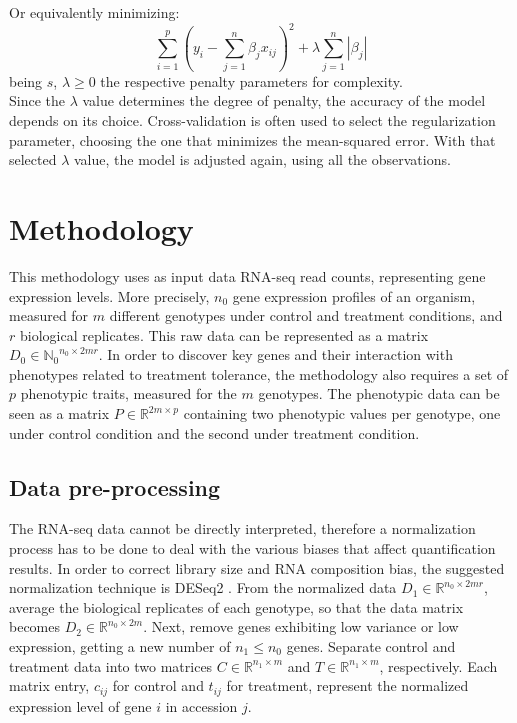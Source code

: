 \documentclass[12pt,journal, onecolumn]{IEEEtran}
\newcommand{\abs}[1]{\left\vert#1\right\vert}
\begin{document}
Or equivalently minimizing:
\begin{equation}
\sum_{i=1}^{p}{\left( y_i-\sum_{j=1}^n{\beta_j x_{ij}}\right)^2} + \lambda \sum_{j=1}^n\abs{\beta_j}
\end{equation}
being $ s $, $ \lambda \geq 0 $ the respective penalty parameters for complexity.\\



Since the $\lambda$ value determines the degree of penalty, the accuracy of the model depends on its choice. Cross-validation is often used to select the regularization parameter, choosing the one that minimizes the mean-squared error. With that selected $\lambda$ value, the model is adjusted again, using all the observations.\\


\section{Methodology}

This methodology uses as input data RNA-seq read counts, representing gene expression levels. More precisely, $n_0$ gene expression profiles of an organism, measured for $m$ different genotypes under control and treatment conditions, and $r$ biological replicates. 
This raw data can be represented as a matrix $D_0 \in {\mathbb{N}_0}^{n_0 \times 2mr}$. 
In order to discover key genes and their interaction with phenotypes related to treatment tolerance, the methodology also requires a set of $p$ phenotypic traits, measured for the $m$ genotypes. The phenotypic data can be seen as a matrix $P \in \mathbb{R}^{2m \times p}$ containing two phenotypic values per genotype, one under control condition and the second under treatment condition.\\

\subsection{Data pre-processing}

The RNA-seq data cannot be directly interpreted, therefore a normalization process has to be done to deal with the various biases that affect quantification results. In order to correct library size and RNA composition bias, the suggested normalization technique is DESeq2 \cite{love2014moderated}. From the normalized data $D_1 \in \mathbb{R}^{n_0 \times 2mr}$, average the biological replicates of each genotype, so that the data matrix becomes $D_2 \in \mathbb{R}^{n_0 \times 2m}$. Next, remove genes exhibiting low variance or low expression, getting a new number of $n_1 \leq n_0$ genes. Separate control and treatment data into two matrices $C\in \mathbb{R}^{n_1 \times m}$ and $T\in \mathbb{R}^{n_1 \times m}$, respectively. Each matrix entry, $c_{ij}$ for control and $t_{ij}$ for treatment, represent the normalized expression level of gene $i$ in accession $j$.\\
\end{document}
